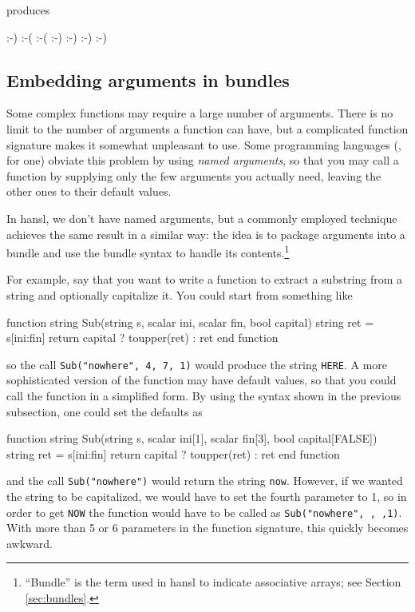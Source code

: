 produces

\begin{code}
:-)
:-( :-(
:-) :-) :-) :-)
\end{code}

\subsection{Embedding arguments in bundles}

Some complex functions may require a large number of arguments. There
is no limit to the number of arguments a function can have, but a
complicated function signature makes it somewhat unpleasant to
use. Some programming languages (, for one) obviate this
problem by using \emph{named arguments}, so that you may call a
function by supplying only the few arguments you actually need, leaving
the other ones to their default values.

In hansl, we don't have named arguments, but a commonly employed
technique achieves the same result in a similar way: the idea is to
package arguments into a bundle and use the bundle syntax to handle
its contents.\footnote{``Bundle'' is the term used in hansl to
  indicate associative arrays; see Section \ref{sec:bundles}.}

For example, say that you want to write a function to extract
a substring from a string and optionally capitalize it. You could
start from something like
\begin{code}
function string Sub(string s, scalar ini, scalar fin, bool capital)
    string ret = s[ini:fin]
    return capital ? toupper(ret) : ret
end function
\end{code}
so the call \texttt{Sub("nowhere", 4, 7, 1)} would produce the string
\texttt{HERE}. A more sophisticated version of the function may have
default values, so that you could call the function in a simplified
form. By using the syntax shown in the previous subsection, one could
set the defaults as
\begin{code}
function string Sub(string s, scalar ini[1], scalar fin[3], bool capital[FALSE])
    string ret = s[ini:fin]
    return capital ? toupper(ret) : ret
end function
\end{code}
and the call \texttt{Sub("nowhere")} would return the string
\texttt{now}. However, if we wanted the string to be capitalized, we
would have to set the fourth parameter to 1, so in order to get
\texttt{NOW} the function would have to be called as
\texttt{Sub("nowhere", , ,1)}. With more than 5 or 6 parameters in the
function signature, this quickly becomes awkward.

